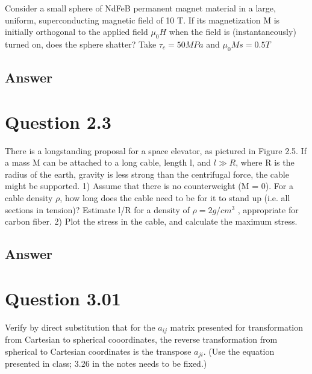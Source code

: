 \documentclass[
	12pt, %
]{fphw}
\begin{document}
\begin{problem}
Consider a small sphere of NdFeB permanent magnet material in a
large, uniform, superconducting magnetic field of 10 T. If its magnetization M is 
initially orthogonal to the applied field $\mu_0 H$ when the
field is (instantaneously) turned on, does the sphere shatter? Take
$ \tau_c = 50 MPa$ and $\mu_0 Ms = 0.5 T$
\end{problem}


\subsection*{Answer}



\section*{Question 2.3}

\begin{problem}
There is a longstanding proposal for a space elevator, as pictured in
Figure 2.5. If a mass M can be attached to a long cable, length l,
and $l \gg R$, where R is the radius of the earth, gravity is less strong
than the centrifugal force, the cable might be supported. 1) Assume
that there is no counterweight (M = 0). For a cable density $\rho$, how
long does the cable need to be for it to stand up (i.e. all sections
in tension)? Estimate l/R for a density of $\rho = 2 g/cm^3$
, appropriate
for carbon fiber. 2) Plot the stress in the cable, and calculate the maximum stress.
\end{problem}


\subsection*{Answer}




\section*{Question 3.01}

\begin{problem}
Verify by direct substitution that for the $a_{ij}$ matrix presented for transformation 
from Cartesian to spherical cooordinates, 
the reverse transformation from spherical to Cartesian coordinates is the transpose $a_{ji}$.  
(Use the equation presented in class; 3.26 in the notes needs to be fixed.)

\end{problem}
\end{document}
